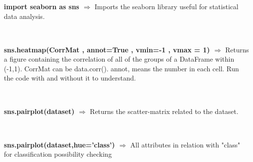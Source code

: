 \documentclass[a4paper,18pt]{article}
\begin{document}
\subsection{\colorbox {matgreen}{\color{white}{\large import seaborn as sns}}}
\textbf{import seaborn as sns $\Rightarrow$} Imports the seaborn library useful for statistical data analysis.\\\\


\subsection{\colorbox {matgreen}{\color{white}{\large Correlation Matrix}}}
\textbf{sns.heatmap(CorrMat , annot=True , vmin=-1 , vmax = 1) $\Rightarrow$} Returns a figure containing the correlation of all of the groups of a DataFrame within (-1,1). CorrMat can be data.corr(). annot, means the number in each cell. Run the code with and without it to understand.\\\\


\subsection{\colorbox {matgreen}{\color{white}{\large Scatter Matrix}}}
\textbf{sns.pairplot(dataset) $\Rightarrow$} Returns the scatter-matrix related to the dataset.\\\\


\subsection{\colorbox {matgreen}{\color{white}{\large Scatter Matrix II}}}
\textbf{sns.pairplot(dataset,hue='class') $\Rightarrow$} All attributes in relation with "class" for classification possibility checking\\\\

\end{document}
